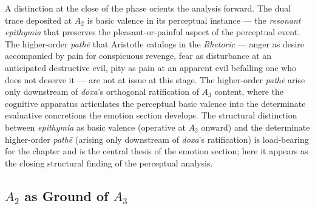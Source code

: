 A distinction at the close of the phase orients the analysis forward. The dual trace deposited at $A_2$ is basic valence in its perceptual instance --- the \textit{resonant epithymia} that preserves the pleasant-or-painful aspect of the perceptual event. The higher-order \textit{pathē} that Aristotle catalogs in the \textit{Rhetoric} --- anger as desire accompanied by pain for conspicuous revenge, fear as disturbance at an anticipated destructive evil, pity as pain at an apparent evil befalling one who does not deserve it --- are not at issue at this stage. The higher-order \textit{pathē} arise only downstream of \textit{doxa}'s orthogonal ratification of $A_3$ content, where the cognitive apparatus articulates the perceptual basic valence into the determinate evaluative concretions the emotion section develops. The structural distinction between \textit{epithymia} as basic valence (operative at $A_2$ onward) and the determinate higher-order \textit{pathē} (arising only downstream of \textit{doxa}'s ratification) is load-bearing for the chapter and is the central thesis of the emotion section; here it appears as the closing structural finding of the perceptual analysis.

\subsection{$A_2$ as Ground of $A_3$}

